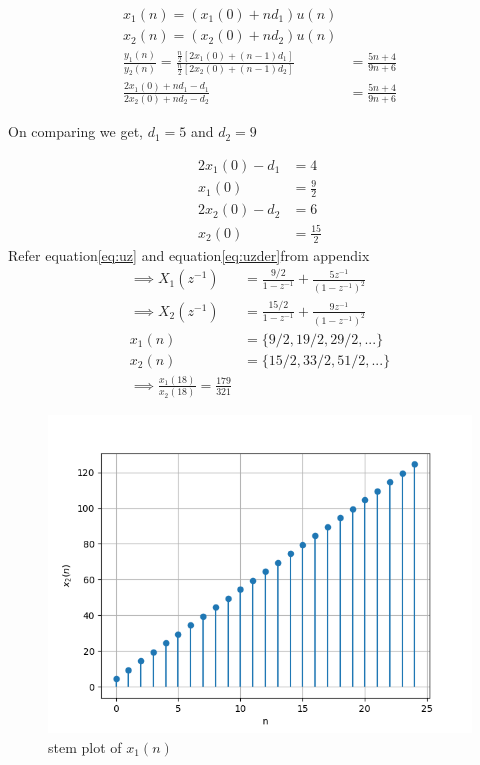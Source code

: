 \documentclass[a4,12pt,onecolumn]{IEEEtran}
\begin{document}
\begin{align}
x_1(n)=(x_1(0)+nd_1)u(n)\\
x_2(n)=(x_2(0)+nd_2)u(n)\\
\frac{y_1(n)}{y_2(n)}=\frac{\frac{n}{2}\left[ 2x_1(0) +(n-1)d_1 \right]}{\frac{n}{2}\left[ 2x_2(0) +(n-1)d_2 \right]}&= \frac{5n+4}{9n+6}\\
\frac{2x_1(0) +nd_1-d_1}{2x_2(0) +nd_2-d_2 }&= \frac{5n+4}{9n+6}
\end{align}
\begin{center}
On comparing we get, $ d_1 = 5 $ and $ d_2 = 9$ \\
\end{center}
\begin{align}
2x_1(0) - d_1 &= 4\\
x_1(0) &=\frac{9}{2}\\
2x_2(0)- d_2&=6\\
x_2(0) &=\frac{15}{2}
\end{align}
Refer equation\eqref{eq:uz}  and equation\eqref{eq:uzder}from appendix
\begin{align}
   \implies X_1(z^{-1}) &=\frac{9/2}{1-z^{-1}} + \frac{ 5z^{-1}}{(1-z^{-1})^2}\\
    \implies X_2(z^{-1})&= \frac{15/2}{1-z^{-1}} + \frac{9z^{-1}}{(1-z^{-1})^2}\\
x_1(n)&= \lbrace 9/2,19/2,29/2,...\rbrace \\
x_2(n)&= \lbrace 15/2,33/2,51/2,...\rbrace \\
\implies \frac{x_1(18)}{x_2(18)}=\frac{179}{321}
\end{align}
\begin{figure}[h!]
	\centering
	\includegraphics[width=\columnwidth]{ncert-maths/11/9/2/9/figs/fig1.png}
	
	\caption{\large{stem plot of $x_1(n)$}}
\end{figure}
\end{document}
